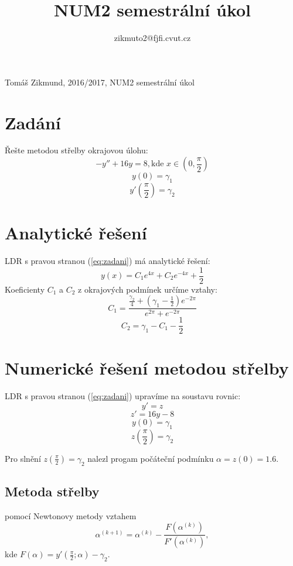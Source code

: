 \documentclass[11pt, a4paper]{article}
\title{NUM2 semestrální úkol}
\author{zikmuto2@fjfi.cvut.cz}
\begin{document}
Tomáš Zikmund,  2016/2017, NUM2 semestrální úkol

\section{Zadání}
Řešte metodou střelby okrajovou úlohu:
\begin{equation}
 -y'' + 16 y = 8, \mbox{kde~} x \in (0,\frac{\pi}{2})
 \label{eq:zadani}
\end{equation}
\[y(0) = \gamma_1 \]
\[y'(\frac{\pi}{2}) = \gamma_2\]

\section{Analytické řešení}
LDR s pravou stranou (\ref{eq:zadani}) má analytické řešení:
\[y(x) = C_1 e^{4x} + C_2 e^{-4x} + \frac{1}{2}\]
Koeficienty \(C_1\) a \(C_2\) z okrajových podmínek určíme vztahy:
\[C_1 = \frac{\frac{\gamma_2}{4} + \left(\gamma_1 - \frac{1}{2}\right) e^{-2\pi}}{e^{2\pi} + e^{-2\pi}}\]
\[C_2 = \gamma_1 - C_1 - \frac{1}{2}\]



\section{Numerické řešení metodou střelby}
LDR s pravou stranou (\ref{eq:zadani}) upravíme na soustavu rovnic:
\[y' = z\]
\[z' = 16 y  - 8\]
\[y(0) = \gamma_1 \]
\[z(\frac{\pi}{2}) = \gamma_2\]

Pro slnění \(z(\frac{\pi}{2}) = \gamma_2\) nalezl progam počáteční podmínku \(\alpha = z(0) = 1.6\).

\subsection{Metoda střelby}
 pomocí Newtonovy metody vztahem 
\[\alpha^{(k+1)} = \alpha^{(k)} - \frac{F(\alpha^{(k)})}{F'(\alpha^{(k)})}, \]
kde \(F(\alpha) = y'(\frac{\pi}{2};\alpha) - \gamma_2\).
\end{document}

